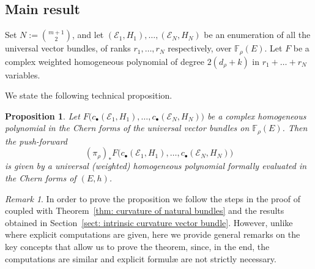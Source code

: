 \documentclass[a4paper]{amsart}
\theoremstyle{plain}%
\newtheorem{proposition}[theorem]{Proposition}
\theoremstyle{definition}
\theoremstyle{remark}
\newtheorem{remark}[theorem]{Remark}
\newcommand{\FF}{\mathbb{F}}
\begin{document}
\subsection{Main result}
Set $ N := \binom{m+1}{2} $, and let $ (\mathcal{E}_1,H_1), \dots, (\mathcal{E}_N,H_N) $ be an enumeration of all the universal vector bundles, of ranks $ r_1, \dots, r_N $ respectively, over $ \FF_{\rho}(E) $.
Let $ F $ be a complex weighted homogeneous polynomial of degree $ 2(d_\rho + k) $ in $ r_1 + \dots + r_N $ variables.

We state the following technical proposition.
\begin{proposition}\label{lem: pol homogeneous general}
	Let $ F\bigl(c_{\bullet}(\mathcal{E}_1,H_1),\dots,c_{\bullet}(\mathcal{E}_N,H_N)\bigr) $ be a complex homogeneous polynomial in the Chern forms of the universal vector bundles on $ \FF_{\rho}(E) $.
	Then the push-forward
	\[
	(\pi_{\rho})_{*} F\bigl(c_{\bullet}(\mathcal{E}_1,H_1),\dots,c_{\bullet}(\mathcal{E}_N,H_N)\bigr)
	\]
	is given by a universal (weighted) homogeneous polynomial formally evaluated in the Chern forms of $ (E,h) $.
\end{proposition}

\begin{remark}
	In order to prove the proposition we follow the steps in the proof of \cite[Proposition~{3.1}]{DF20} coupled with Theorem~\ref{thm: curvature of natural bundles} and the results obtained in Section~\ref{sect: intrinsic curvature vector bundle}.
	However, unlike \cite[Proposition~{3.1}]{DF20} where explicit computations are given, here we provide general remarks on the key concepts that allow us to prove the theorem, since, in the end, the computations are similar and explicit formul{\ae} are not strictly necessary.
\end{remark}
\end{document}
